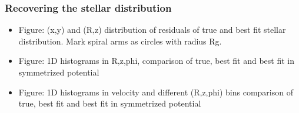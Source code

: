 \documentclass[iop,revtex4,numberedappendix,appendixfloats]{emulateapj}
\begin{document}
\subsubsection{Recovering the stellar distribution}

\begin{itemize}
\item Figure: (x,y) and (R,z) distribution of residuals of true and best fit stellar distribution. Mark spiral arms as circles with radius Rg.
\item Figure: 1D histograms in R,z,phi, comparison of  true, best fit and best fit in symmetrized potential
\item Figure: 1D histograms in velocity and different (R,z,phi) bins comparison of  true, best fit and best fit in symmetrized potential
\end{itemize}
\end{document}
